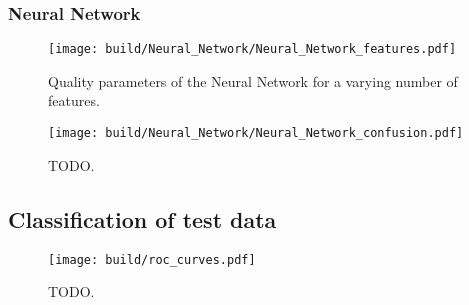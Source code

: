 \subsubsection{Neural Network}

\begin{figure}[H]
  \centering
  \texttt{[image: build/Neural\_Network/Neural\_Network\_features.pdf]}
  \caption{Quality parameters of the Neural Network for a varying number of features.}
  \label{fig:NeuralNetwork_features}
\end{figure}

\begin{figure}[H]
  \centering
  \texttt{[image: build/Neural\_Network/Neural\_Network\_confusion.pdf]}
  \caption{TODO.}
  \label{fig:NeuralNetwork_confusion}
\end{figure}

\subsection{Classification of test data}

\begin{figure}[H]
  \centering
  \texttt{[image: build/roc\_curves.pdf]}
  \caption{TODO.}
  \label{fig:roc_curves}
\end{figure}

